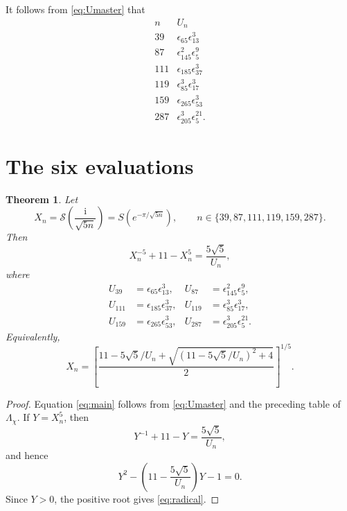 \documentclass[11pt,a4paper]{article}
\newtheorem{theorem}{Theorem}[section]
\newcommand{\ii}{\mathrm i}
\begin{document}
It follows from \eqref{eq:Umaster} that
\[
\begin{array}{c|c}
 n&U_n\\ \hline
39&\epsilon_{65}\epsilon_{13}^{3}\\
87&\epsilon_{145}^{2}\epsilon_5^{9}\\
111&\epsilon_{185}\epsilon_{37}^{3}\\
119&\epsilon_{85}^{3}\epsilon_{17}^{3}\\
159&\epsilon_{265}\epsilon_{53}^{3}\\
287&\epsilon_{205}^{3}\epsilon_5^{21}.
\end{array}
\]

\section{The six evaluations}
\begin{theorem}\label{thm:main}
Let
\[
X_n=\mathcal S\!\left(\frac{\ii}{\sqrt{5n}}\right)=S(e^{-\pi/\sqrt{5n}}),
\qquad n\in\{39,87,111,119,159,287\}.
\]
Then
\begin{equation}
X_n^{-5}+11-X_n^5=\frac{5\sqrt5}{U_n},
\label{eq:main}
\end{equation}
where
\[
\begin{aligned}
U_{39}&=\epsilon_{65}\epsilon_{13}^{3},&
U_{87}&=\epsilon_{145}^{2}\epsilon_5^{9},\\
U_{111}&=\epsilon_{185}\epsilon_{37}^{3},&
U_{119}&=\epsilon_{85}^{3}\epsilon_{17}^{3},\\
U_{159}&=\epsilon_{265}\epsilon_{53}^{3},&
U_{287}&=\epsilon_{205}^{3}\epsilon_5^{21}.
\end{aligned}
\]
Equivalently,
\begin{equation}
X_n=\left[
\frac{11-5\sqrt5/U_n+\sqrt{(11-5\sqrt5/U_n)^2+4}}{2}
\right]^{1/5}.
\label{eq:radical}
\end{equation}
\end{theorem}

\begin{proof}
Equation \eqref{eq:main} follows from \eqref{eq:Umaster} and the preceding table of $\Lambda_\chi$.  If $Y=X_n^5$, then
\[
Y^{-1}+11-Y=\frac{5\sqrt5}{U_n},
\]
and hence
\[
Y^2-\left(11-\frac{5\sqrt5}{U_n}\right)Y-1=0.
\]
Since $Y>0$, the positive root gives \eqref{eq:radical}.
\end{proof}
\end{document}

